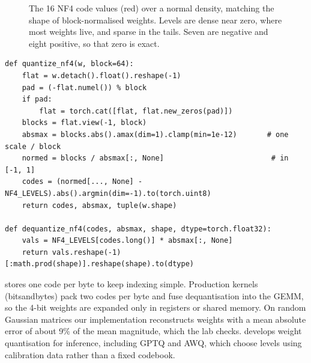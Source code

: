 \begin{figure}[ht]
\centering
{}
\caption{The 16 NF4 code values (red) over a normal density, matching the shape of
block-normalised weights. Levels are dense near zero, where most weights live, and
sparse in the tails. Seven are negative and eight positive, so that zero is exact.}
\label{fig:instruct:nf4}
\end{figure}

\begin{lstlisting}[caption={Blockwise NF4 quantisation (one code per byte for clarity).},label={lst:instruct:nf4}]
def quantize_nf4(w, block=64):
    flat = w.detach().float().reshape(-1)
    pad = (-flat.numel()) % block
    if pad:
        flat = torch.cat([flat, flat.new_zeros(pad)])
    blocks = flat.view(-1, block)
    absmax = blocks.abs().amax(dim=1).clamp(min=1e-12)       # one scale / block
    normed = blocks / absmax[:, None]                         # in [-1, 1]
    codes = (normed[..., None] - NF4_LEVELS).abs().argmin(dim=-1).to(torch.uint8)
    return codes, absmax, tuple(w.shape)

def dequantize_nf4(codes, absmax, shape, dtype=torch.float32):
    vals = NF4_LEVELS[codes.long()] * absmax[:, None]
    return vals.reshape(-1)[:math.prod(shape)].reshape(shape).to(dtype)
\end{lstlisting}

 stores one code per byte to keep indexing simple. Production
kernels (bitsandbytes) pack two codes per byte and fuse dequantisation into the GEMM,
so the 4-bit weights are expanded only in registers or shared memory. On random
Gaussian matrices our implementation reconstructs weights with a mean absolute error
of about 9\% of the mean magnitude, which the lab checks.  develops
weight quantisation for inference, including GPTQ and AWQ, which choose levels using
calibration data rather than a fixed codebook.

